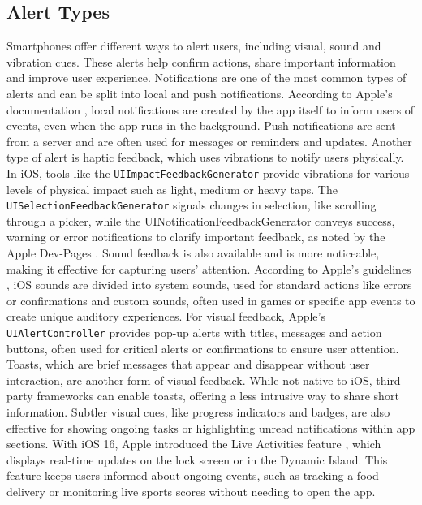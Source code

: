 \subsection{Alert Types}
Smartphones offer different ways to alert users, including visual, sound and vibration cues. 
These alerts help confirm actions, share important information and improve user experience.
Notifications are one of the most common types of alerts and can be split into local and push notifications. 
According to Apple's documentation \cite{apple_local_notifications}\cite{apple_push_notifications}, local notifications are created by the app itself to inform users of events, even when the app runs in the background. 
Push notifications are sent from a server and are often used for messages or reminders and updates.
Another type of alert is haptic feedback, which uses vibrations to notify users physically. 
In iOS, tools like the \lstinline{UIImpactFeedbackGenerator} provide vibrations for various levels of physical impact such as light, medium or heavy taps.
The \lstinline{UISelectionFeedbackGenerator} signals changes in selection, like scrolling through a picker, while the UINotificationFeedbackGenerator conveys success, warning or error notifications to clarify important feedback, as noted by the Apple Dev-Pages \cite{apple_haptics}.
Sound feedback is also available and is more noticeable, making it effective for capturing users' attention.
According to Apple's guidelines \cite{apple_sound_guidelines}, iOS sounds are divided into system sounds, used for standard actions like errors or confirmations and custom sounds, often used in games or specific app events to create unique auditory experiences.
For visual feedback, Apple's \lstinline{UIAlertController} \cite{apple_alerts} provides pop-up alerts with titles, messages and action buttons, often used for critical alerts or confirmations to ensure user attention. 
Toasts, which are brief messages that appear and disappear without user interaction, are another form of visual feedback. 
While not native to iOS, third-party frameworks can enable toasts, offering a less intrusive way to share short information. 
Subtler visual cues, like progress indicators and badges, are also effective for showing ongoing tasks or highlighting unread notifications within app sections.
With iOS 16, Apple introduced the Live Activities feature \cite{apple_live_activities}, which displays real-time updates on the lock screen or in the Dynamic Island. 
This feature keeps users informed about ongoing events, such as tracking a food delivery or monitoring live sports scores without needing to open the app.

